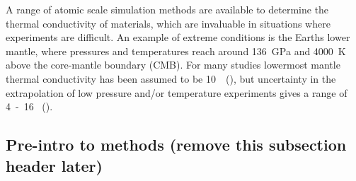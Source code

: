 \documentclass[%
preprint,                                  %
nofootinbib,
 amsmath,amssymb,
 aps,
]{revtex4-1}
\begin{document}
A range of atomic scale simulation methods are available to determine the thermal conductivity of materials, which are invaluable in situations where experiments are difficult. An example of extreme conditions is the Earth\textsc{}s lower mantle, where pressures and temperatures reach around 136~GPa and 4000~K above the core-mantle boundary (CMB). For many studies lowermost mantle thermal conductivity has been assumed to be 10~\wmk~(\citet{Lay2008}), but uncertainty in the extrapolation of low pressure and/or temperature experiments gives a range of 4~-~16 \wmk~(\citet{Brown1986, Osako1991, Hofmeister1999, Goncharov2009, Manthilake2011, Ohta2012}).

 




\subsection{\label{sec:intro.pre}Pre-intro to methods (remove this subsection header later)}
\end{document}
